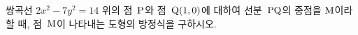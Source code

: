 쌍곡선 $2x^2-7y^2=14$ 위의 점~$\mathrm{P}$와 점~$\mathrm{Q}(1{,}\mkern3mu\mathopen{}0)$에 대하여 선분~$\mathrm{PQ}$의 중점을 $\mathrm{M}$이라 할 때, 점~$\mathrm{M}$이 나타내는 도형의 방정식을 구하시오.
